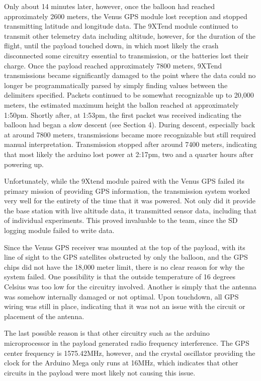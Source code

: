 \documentclass[12pt,]{article}
\begin{document}
Only about 14 minutes later, however, once the balloon had reached
approximately 2600 meters, the Venus GPS module lost reception and
stopped transmitting latitude and longitude data. The 9XTend module
continued to transmit other telemetry data including altitude, however,
for the duration of the flight, until the payload touched down, in which
most likely the crash disconnected some circuitry essential to
transmission, or the batteries lost their charge. Once the payload
reached approximately 7800 meters, 9XTend transmissions became
significantly damaged to the point where the data could no longer be
programmatically parsed by simply finding values between the delimiters
specified. Packets continued to be somewhat recognizable up to 20,000
meters, the estimated maximum height the ballon reached at approximately
1:50pm. Shortly after, at 1:53pm, the first packet was received
indicating the balloon had began a slow descent (see Section 4). During
descent, especially back at around 7800 meters, transmissions became
more recognizable but still required manual interpretation. Transmission
stopped after around 7400 meters, indicating that most likely the
arduino lost power at 2:17pm, two and a quarter hours after powering up.

Unfortunately, while the 9Xtend module paired with the Venus GPS failed
its primary mission of providing GPS information, the transmission
system worked very well for the entirety of the time that it was
powered. Not only did it provide the base station with live altitude
data, it transmitted sensor data, including that of individual
experiments. This proved invaluable to the team, since the SD logging
module failed to write data.

Since the Venus GPS receiver was mounted at the top of the payload, with
its line of sight to the GPS satellites obstructed by only the balloon,
and the GPS chips did not have the 18,000 meter limit, there is no clear
reason for why the system failed. One possibility is that the outside
temperature of 16 degrees Celsius was too low for the circuitry
involved. Another is simply that the antenna was somehow internally
damaged or not optimal. Upon touchdown, all GPS wiring was still in
place, indicating that it was not an issue with the circuit or placement
of the antenna.

The last possible reason is that other circuitry such as the arduino
microprocessor in the payload generated radio frequency interference.
The GPS center frequency is 1575.42MHz, however, and the crystal
oscillator providing the clock for the Arduino Mega only runs at 16MHz,
which indicates that other circuits in the payload were most likely not
causing this issue.
\end{document}

